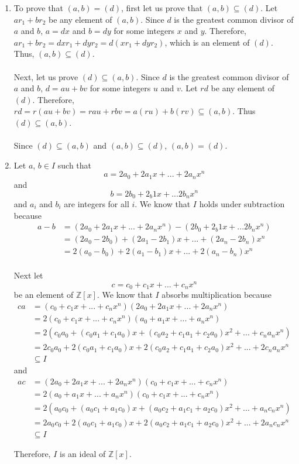 \documentclass{article}
\begin{document}
\begin{enumerate}
\item To prove that $(a,b) = (d)$, first let us prove that $(a,b) \subseteq (d)$.
Let $ar_1 + br_2$ be any element of $(a,b)$.  Since $d$ is the greatest common
divisor of $a$ and $b$, $a = dx$ and $b = dy$ for some integers $x$ and $y$.
Therefore, $ar_1 + br_2 = dxr_1 + dyr_2 = d(xr_{1} + dyr_{2})$, which is an
element of $(d)$.  Thus, $(a,b) \subseteq (d)$. \\ \\
Next, let us prove $(d) \subseteq (a,b)$.  Since $d$ is the greatest common
divisor of $a$ and $b$, $d = au + bv$ for some integers $u$ and $v$.  Let
$rd$ be any element of $(d)$.
Therefore, $rd = r(au + bv) = rau + rbv = a(ru) + b(rv) \subseteq (a,b)$.
Thus $(d) \subseteq (a,b)$. \\ \\
Since $(d) \subseteq (a,b)$ and $(a,b) \subseteq (d)$, $(a,b) = (d)$.

\item
Let $a$, $b \in I$ such that
\[a = 2a_0 + 2a_{1}x + ... + 2a_{n}x^n
\]
and
\[b = 2b_0 + 2_b{1}x + ... 2b_{n}x^n
\]
and $a_i$ and $b_i$ are integers for all
$i$.  We know that $I$ holds under subtraction because
\begin{align*}
a - b &= (2a_0 + 2a_{1}x + ... + 2a_{n}x^{n}) - (2b_0 + 2_b{1}x + ... 2b_{n}x^n) \\
&= (2a_0 - 2b_0) + (2a_{1} - 2b_{1})x + ... + (2a_{n} - 2b_{n})x^n \\
&= 2(a_0 - b_0) + 2(a_{1} - b_{1})x + ... + 2(a_{n} - b_{n})x^n \\
\end{align*}

Next let
\[
c = c_0 + c_{1}x + ... + c_{n}x^n
\]
be an element of $\mathbb{Z}[x]$.
We know that $I$ absorbs multiplication because
\begin{align*}
ca &= (c_0 + c_{1}x + ... + c_{n}x^{n})(2a_0 + 2a_{1}x + ...+ 2a_{n}x^{n}) \\
&= 2(c_0 + c_{1}x + ... + c_{n}x^{n})(a_0 + a_{1}x + ... + a_{n}x^{n}) \\
&= 2(c_{0}a_{0} + (c_{0}a_{1} + c_{1}a_{0})x + (c_{0}a_{2} + c_{1}a_{1} + c_{2}a_{0})x^{2}
+ ... + c_{n}a_{n}x^{n}) \\
&= 2c_{0}a_{0} + 2(c_{0}a_{1} + c_{1}a_{0})x + 2(c_{0}a_{2} + c_{1}a_{1} + c_{2}a_{0})x^{2}
+ ... + 2c_{n}a_{n}x^{n} \\
&\subseteq I
\end{align*}
and
\begin{align*}
ac &= (2a_0 + 2a_{1}x + ...+ 2a_{n}x^{n})(c_0 + c_{1}x + ... + c_{n}x^{n}) \\
&= 2(a_0 + a_{1}x + ... + a_{n}x^{n})(c_0 + c_{1}x + ... + c_{n}x^{n}) \\
&= 2(a_{0}c_{0} + (a_{0}c_{1} + a_{1}c_{0})x + (a_{0}c_{2} + a_{1}c_{1} + a_{2}c_{0})x^{2}
+ ... + a_{n}c_{n}x^{n}) \\
&= 2a_{0}c_{0} + 2(a_{0}c_{1} + a_{1}c_{0})x + 2(a_{0}c_{2} + a_{1}c_{1} + a_{2}c_{0})x^{2}
+ ... + 2a_{n}c_{n}x^{n} \\
&\subseteq I
\end{align*}

Therefore, $I$ is an ideal of $\mathbb{Z}[x]$.

\end{enumerate}
\end{document}

